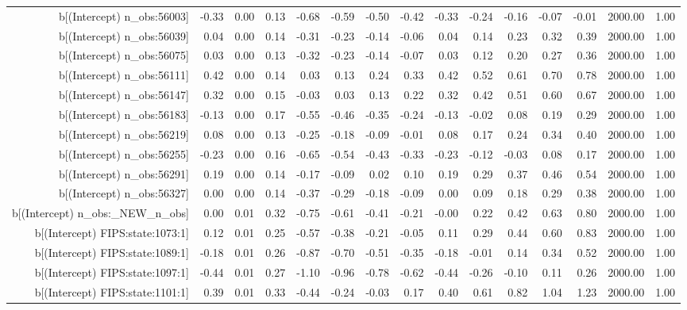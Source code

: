 \begin{table}[ht]
\begin{tabular}{rrrrrrrrrrrrrrr}
  b[(Intercept) n\_obs:56003] & -0.33 & 0.00 & 0.13 & -0.68 & -0.59 & -0.50 & -0.42 & -0.33 & -0.24 & -0.16 & -0.07 & -0.01 & 2000.00 & 1.00 \\ 
  b[(Intercept) n\_obs:56039] & 0.04 & 0.00 & 0.14 & -0.31 & -0.23 & -0.14 & -0.06 & 0.04 & 0.14 & 0.23 & 0.32 & 0.39 & 2000.00 & 1.00 \\ 
  b[(Intercept) n\_obs:56075] & 0.03 & 0.00 & 0.13 & -0.32 & -0.23 & -0.14 & -0.07 & 0.03 & 0.12 & 0.20 & 0.27 & 0.36 & 2000.00 & 1.00 \\ 
  b[(Intercept) n\_obs:56111] & 0.42 & 0.00 & 0.14 & 0.03 & 0.13 & 0.24 & 0.33 & 0.42 & 0.52 & 0.61 & 0.70 & 0.78 & 2000.00 & 1.00 \\ 
  b[(Intercept) n\_obs:56147] & 0.32 & 0.00 & 0.15 & -0.03 & 0.03 & 0.13 & 0.22 & 0.32 & 0.42 & 0.51 & 0.60 & 0.67 & 2000.00 & 1.00 \\ 
  b[(Intercept) n\_obs:56183] & -0.13 & 0.00 & 0.17 & -0.55 & -0.46 & -0.35 & -0.24 & -0.13 & -0.02 & 0.08 & 0.19 & 0.29 & 2000.00 & 1.00 \\ 
  b[(Intercept) n\_obs:56219] & 0.08 & 0.00 & 0.13 & -0.25 & -0.18 & -0.09 & -0.01 & 0.08 & 0.17 & 0.24 & 0.34 & 0.40 & 2000.00 & 1.00 \\ 
  b[(Intercept) n\_obs:56255] & -0.23 & 0.00 & 0.16 & -0.65 & -0.54 & -0.43 & -0.33 & -0.23 & -0.12 & -0.03 & 0.08 & 0.17 & 2000.00 & 1.00 \\ 
  b[(Intercept) n\_obs:56291] & 0.19 & 0.00 & 0.14 & -0.17 & -0.09 & 0.02 & 0.10 & 0.19 & 0.29 & 0.37 & 0.46 & 0.54 & 2000.00 & 1.00 \\ 
  b[(Intercept) n\_obs:56327] & 0.00 & 0.00 & 0.14 & -0.37 & -0.29 & -0.18 & -0.09 & 0.00 & 0.09 & 0.18 & 0.29 & 0.38 & 2000.00 & 1.00 \\ 
  b[(Intercept) n\_obs:\_NEW\_n\_obs] & 0.00 & 0.01 & 0.32 & -0.75 & -0.61 & -0.41 & -0.21 & -0.00 & 0.22 & 0.42 & 0.63 & 0.80 & 2000.00 & 1.00 \\ 
  b[(Intercept) FIPS:state:1073:1] & 0.12 & 0.01 & 0.25 & -0.57 & -0.38 & -0.21 & -0.05 & 0.11 & 0.29 & 0.44 & 0.60 & 0.83 & 2000.00 & 1.00 \\ 
  b[(Intercept) FIPS:state:1089:1] & -0.18 & 0.01 & 0.26 & -0.87 & -0.70 & -0.51 & -0.35 & -0.18 & -0.01 & 0.14 & 0.34 & 0.52 & 2000.00 & 1.00 \\ 
  b[(Intercept) FIPS:state:1097:1] & -0.44 & 0.01 & 0.27 & -1.10 & -0.96 & -0.78 & -0.62 & -0.44 & -0.26 & -0.10 & 0.11 & 0.26 & 2000.00 & 1.00 \\ 
  b[(Intercept) FIPS:state:1101:1] & 0.39 & 0.01 & 0.33 & -0.44 & -0.24 & -0.03 & 0.17 & 0.40 & 0.61 & 0.82 & 1.04 & 1.23 & 2000.00 & 1.00 \\ 

\end{tabular}
\end{table}
